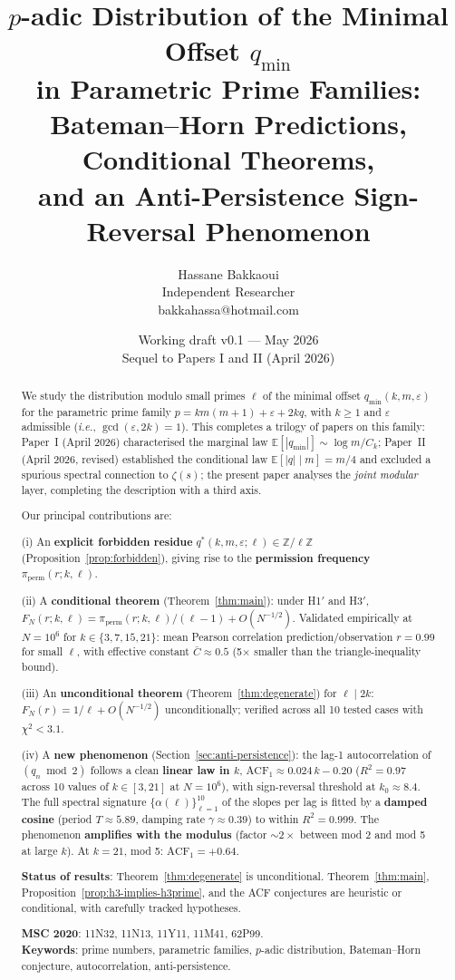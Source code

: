 \documentclass[11pt,a4paper]{article}
\title{\large $p$-adic Distribution of the Minimal Offset $q_{\min}$\\
in Parametric Prime Families:\\[3pt]
\Large Bateman--Horn Predictions, Conditional Theorems,\\
and an Anti-Persistence Sign-Reversal Phenomenon}
\author{Hassane Bakkaoui\\\small Independent Researcher\\\small bakkahassa@hotmail.com}
\date{Working draft v0.1 --- May 2026\\\small Sequel to Papers I and II (April 2026)}
\theoremstyle{plain}
\theoremstyle{definition}
\newcommand{\qmin}{q_{\min}}
\newcommand{\Z}{\mathbb{Z}}
\newcommand{\PiP}{\pi_{\mathrm{perm}}}
\newcommand{\eps}{\varepsilon}
\begin{document}
\maketitle

\begin{abstract}
We study the distribution modulo small primes $\ell$ of the minimal offset
$\qmin(k, m, \eps)$ for the parametric prime family
$p = km(m+1) + \eps + 2kq$, with $k \ge 1$ and $\eps$ admissible
(\textit{i.e.}, $\gcd(\eps, 2k) = 1$). This completes a trilogy of papers on
this family: Paper~I (April 2026) characterised the marginal law
$\mathbb{E}[|\qmin|] \sim \log m / C_k$; Paper~II (April 2026, revised)
established the conditional law $\mathbb{E}[|q| \mid m] = m/4$ and excluded a
spurious spectral connection to $\zeta(s)$; the present paper analyses the
\emph{joint modular} layer, completing the description with a third axis.

\smallskip
\noindent Our principal contributions are:

\smallskip
(i) An \textbf{explicit forbidden residue} $q^*(k, m, \eps; \ell) \in \Z/\ell\Z$
(Proposition~\ref{prop:forbidden}), giving rise to the \textbf{permission frequency}
$\PiP(r; k, \ell)$.

\smallskip
(ii) A \textbf{conditional theorem} (Theorem~\ref{thm:main}): under H1$'$ and
H3$'$, $F_N(r; k, \ell) = \PiP(r; k, \ell)/(\ell-1) + O(N^{-1/2})$. Validated
empirically at $N = 10^6$ for $k \in \{3, 7, 15, 21\}$: mean Pearson correlation
prediction/observation $r = 0.99$ for small $\ell$, with effective constant
$\bar C \approx 0.5$ (5$\times$ smaller than the triangle-inequality bound).

\smallskip
(iii) An \textbf{unconditional theorem} (Theorem~\ref{thm:degenerate}) for
$\ell \mid 2k$: $F_N(r) = 1/\ell + O(N^{-1/2})$ unconditionally; verified across
all 10 tested cases with $\chi^2 < 3.1$.

\smallskip
(iv) A \textbf{new phenomenon} (Section~\ref{sec:anti-persistence}): the lag-1
autocorrelation of $(q_n \bmod 2)$ follows a clean \textbf{linear law in $k$},
$\mathrm{ACF}_1 \approx 0.024\,k - 0.20$ ($R^2 = 0.97$ across 10 values of
$k \in [3, 21]$ at $N = 10^6$), with sign-reversal threshold at $k_0 \approx 8.4$.
The full spectral signature $\{\alpha(\ell)\}_{\ell=1}^{10}$ of the slopes per
lag is fitted by a \textbf{damped cosine} (period $T \approx 5.89$, damping
rate $\gamma \approx 0.39$) to within $R^2 = 0.999$. The phenomenon
\textbf{amplifies with the modulus} (factor $\sim 2\times$ between mod 2 and
mod 5 at large $k$). At $k=21$, mod 5: $\mathrm{ACF}_1 = +0.64$.

\smallskip
\textbf{Status of results}: Theorem~\ref{thm:degenerate} is unconditional.
Theorem~\ref{thm:main}, Proposition~\ref{prop:h3-implies-h3prime}, and the
ACF conjectures are heuristic or conditional, with carefully tracked
hypotheses.

\smallskip
\textbf{MSC 2020}: 11N32, 11N13, 11Y11, 11M41, 62P99.\\
\textbf{Keywords}: prime numbers, parametric families, $p$-adic distribution,
Bateman--Horn conjecture, autocorrelation, anti-persistence.
\end{abstract}
\end{document}
